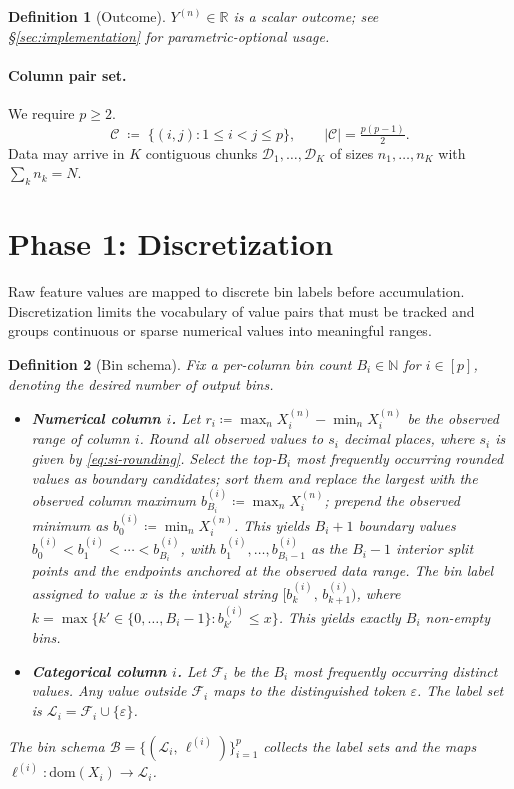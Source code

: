 \documentclass[11pt]{article}
\newtheorem{definition}{Definition}
\begin{document}
\begin{definition}[Outcome]
\label{def:outcome}
$Y^{(n)} \in \mathbb{R}$ is a scalar outcome; see \S\ref{sec:implementation} for parametric-optional usage.
\end{definition}

\paragraph{Column pair set.}
We require $p \ge 2$.
\[
  \mathcal{C} \;\coloneqq\; \bigl\{(i,j) : 1 \le i < j \le p\bigr\}, \qquad |\mathcal{C}| = \tfrac{p(p-1)}{2}.
\]
Data may arrive in $K$ contiguous chunks $\mathcal{D}_1,\ldots,\mathcal{D}_K$ of sizes $n_1,\ldots,n_K$ with $\sum_k n_k = N$.

\section{Phase 1: Discretization}
\label{sec:discretize}

Raw feature values are mapped to discrete bin labels before accumulation.
Discretization limits the vocabulary of value pairs that must be tracked and groups continuous or sparse numerical values into meaningful ranges.

\begin{definition}[Bin schema]
\label{def:bin-schema}
Fix a per-column bin count $B_i \in \mathbb{N}$ for $i \in [p]$, denoting the desired number of output bins.
\begin{itemize}
  \item \textbf{Numerical column $i$.}
    Let $r_i \coloneqq \max_n X_i^{(n)} - \min_n X_i^{(n)}$ be the observed range of column $i$.
    Round all observed values to $s_i$ \emph{decimal places}, where $s_i$ is given by \eqref{eq:si-rounding}.
    Select the top-$B_i$ most frequently occurring rounded values as boundary candidates; sort them and replace the largest with the observed column maximum $b_{B_i}^{(i)} \coloneqq \max_n X_i^{(n)}$; prepend the observed minimum as $b_0^{(i)} \coloneqq \min_n X_i^{(n)}$.
    This yields $B_i + 1$ boundary values $b_0^{(i)} < b_1^{(i)} < \cdots < b_{B_i}^{(i)}$, with $b_1^{(i)},\ldots,b_{B_i-1}^{(i)}$ as the $B_i - 1$ interior split points and the endpoints anchored at the observed data range.
    The bin label assigned to value $x$ is the interval string $[b_k^{(i)},\, b_{k+1}^{(i)})$, where
    $k = \max\bigl\{k' \in \{0,\ldots,B_i-1\} : b_{k'}^{(i)} \le x\bigr\}$.
    This yields exactly $B_i$ non-empty bins.
  \item \textbf{Categorical column $i$.}
    Let $\mathcal{F}_i$ be the $B_i$ most frequently occurring distinct values.
    Any value outside $\mathcal{F}_i$ maps to the distinguished token $\varepsilon$.
    The label set is $\mathcal{L}_i = \mathcal{F}_i \cup \{\varepsilon\}$.
\end{itemize}
The \emph{bin schema} $\mathcal{B} = \{(\mathcal{L}_i,\, \ell^{(i)})\}_{i=1}^{p}$ collects the label sets and the maps $\ell^{(i)} : \mathrm{dom}(X_i) \to \mathcal{L}_i$.
\end{definition}
\end{document}
